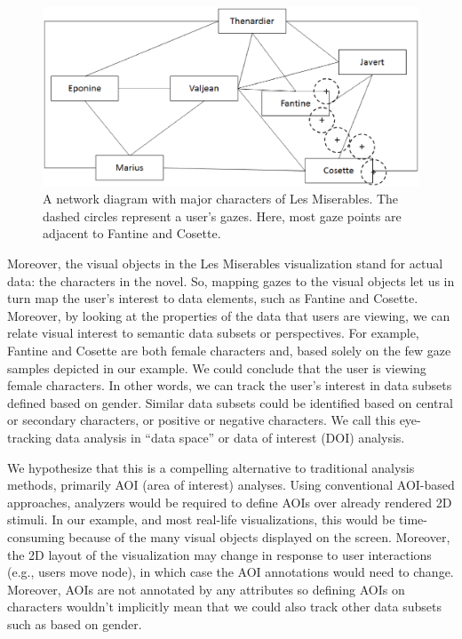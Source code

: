 \begin{figure}[htb]
  \centering
  \includegraphics[width=0.99\linewidth]{images/MiserablesSimple.eps}
  \caption{A network diagram with major characters of Les Miserables. The dashed circles represent a user's gazes. Here, most gaze points are adjacent to Fantine and Cosette. }
    \label{fig:MiserablesSimple}
\end{figure}

Moreover, the visual objects in the Les Miserables visualization stand for actual data: the characters in the novel. So, mapping gazes to the visual objects let us in turn map the user's interest to data elements, such as Fantine and Cosette. Moreover, by looking at the properties of the data that users are viewing, we can relate visual interest to semantic data subsets or perspectives. For example, Fantine and Cosette are both female characters and, based solely on the few gaze samples depicted in our example. We could conclude that the user is viewing female characters. In other words, we can track the user's interest in data subsets defined based on gender. Similar data subsets could be identified based on central or secondary characters, or positive or negative characters. We call this eye-tracking data analysis in ``data space'' or data of interest (DOI) analysis.

We hypothesize that this is a compelling alternative to traditional analysis methods, primarily AOI (area of interest) analyses. Using conventional AOI-based approaches, analyzers would be required to define AOIs over already rendered 2D stimuli. In our example, and most real-life visualizations, this would be time-consuming because of the many visual objects displayed on the screen. Moreover, the 2D layout of the visualization may change in response to user interactions (e.g., users move node), in which case the AOI annotations would need to change. Moreover, AOIs are not annotated by any attributes so defining AOIs on characters wouldn't implicitly mean that we could also track other data subsets such as based on gender.  

